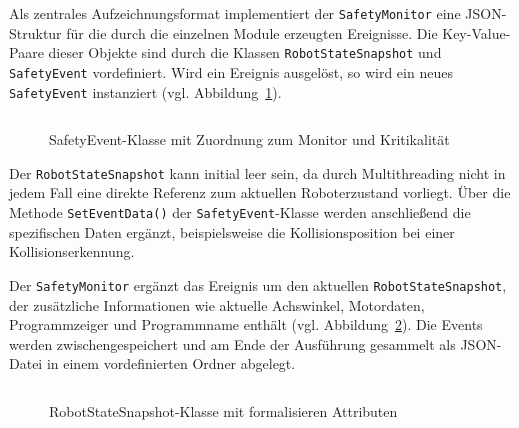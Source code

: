 Als zentrales Aufzeichnungsformat implementiert der \texttt{SafetyMonitor} eine
JSON-Struktur für die durch die einzelnen Module erzeugten Ereignisse.
Die Key-Value-Paare dieser Objekte sind durch die Klassen
\texttt{RobotStateSnapshot} und \texttt{SafetyEvent} vordefiniert.
Wird ein Ereignis ausgelöst, so wird ein neues \texttt{SafetyEvent} instanziert
(vgl. Abbildung~\ref{listing:SafetyEvent}).

\begin{figure}[H]
  \inputminted[fontsize=\footnotesize]{csharp}{code-snippets/SafetyEvent.cs}
  \caption{SafetyEvent-Klasse mit Zuordnung zum Monitor und Kritikalität}
  \label{listing:SafetyEvent}
\end{figure}

Der \texttt{RobotStateSnapshot} kann initial leer sein, da durch Multithreading
nicht in jedem Fall eine direkte Referenz zum aktuellen Roboterzustand vorliegt.
Über die Methode \texttt{SetEventData()} der \texttt{SafetyEvent}-Klasse werden
anschließend die spezifischen Daten ergänzt, beispielsweise die
Kollisionsposition
bei einer Kollisionserkennung.

Der \texttt{SafetyMonitor} ergänzt das Ereignis um den aktuellen
\texttt{RobotStateSnapshot}, der zusätzliche Informationen wie
aktuelle Achswinkel,
Motordaten, Programmzeiger und Programmname enthält
(vgl. Abbildung~\ref{listing:RobotStateSnapshot}).
Die Events werden zwischengespeichert und am Ende der Ausführung gesammelt
als JSON-Datei in einem vordefinierten Ordner abgelegt.

\begin{figure}[H]
  \inputminted[fontsize=\footnotesize]{csharp}{code-snippets/RobotStateSnapshot.cs}
  \caption{RobotStateSnapshot-Klasse mit formalisieren Attributen}
  \label{listing:RobotStateSnapshot}
\end{figure}
